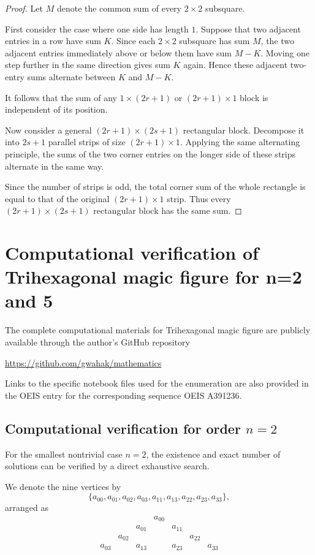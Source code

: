 \documentclass[11pt]{article}
\theoremstyle{plain}
\theoremstyle{definition}
\begin{document}
\begin{proof}
Let \(M\) denote the common sum of every \(2\times2\) subsquare.

First consider the case where one side has length \(1\).  Suppose that
two adjacent entries in a row have sum \(K\).  Since each \(2\times2\)
subsquare has sum \(M\), the two adjacent entries immediately above or
below them have sum \(M-K\).  Moving one step further in the same
direction gives sum \(K\) again.  Hence these adjacent two-entry sums
alternate between \(K\) and \(M-K\).

It follows that the sum of any \(1\times(2r+1)\) or
\((2r+1)\times1\) block is independent of its position.  

Now consider a general \((2r+1)\times(2s+1)\) rectangular block.
Decompose it into \(2s+1\) parallel strips of size
\((2r+1)\times1\). Applying the same alternating principle, the sums
of the two corner entries on the longer side of these strips alternate
in the same way.

Since the number of strips is odd, the total corner sum of the whole
rectangle is equal to that of the original \((2r+1)\times1\) strip.
Thus every \((2r+1)\times(2s+1)\) rectangular block has the same sum.
\end{proof}


\section{Computational verification of Trihexagonal magic figure for n=2 and 5}

The complete computational materials for Trihexagonal magic figure\cite{OEISA391236} are publicly available through the
author’s GitHub repository

\url{https://github.com/gwahak/mathematics}

Links to the specific notebook files used for the enumeration are also
provided in the OEIS entry for the corresponding sequence
{OEIS A391236}\cite{OEISA391236}.

\subsection{Computational verification for order \(n=2\)}

For the smallest nontrivial case \(n=2\), the existence and exact number
of solutions can be verified by a direct exhaustive search.

We denote the nine vertices by
\[
\{a_{00},a_{01},a_{02},a_{03},a_{11},a_{13},a_{22},a_{23},a_{33}\},
\]
arranged as
\[
\begin{array}{ccccccc}
&&& a_{00} \\
&& a_{01} && a_{11} \\
& a_{02} &&&& a_{22} \\
a_{03} && a_{13} && a_{23} && a_{33}
\end{array}
\]
\end{document}
